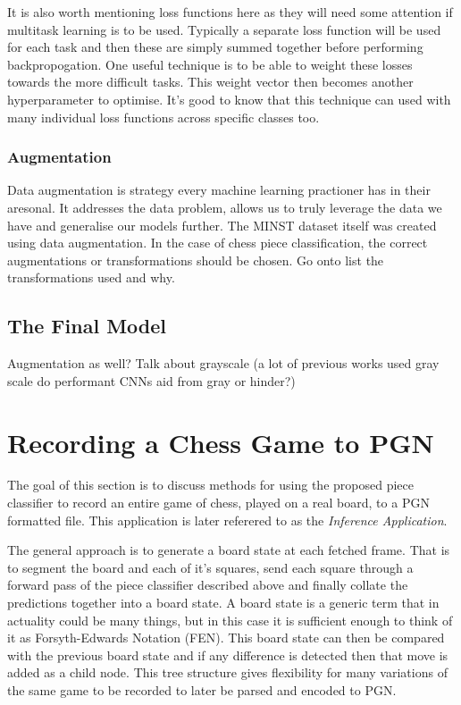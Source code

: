 It is also worth mentioning loss functions here as they will need some attention if multitask learning is to be used.  Typically a separate loss function will be 
used for each task and then these are simply summed together before performing backpropogation.  One useful technique is to be able to weight these losses towards 
the more difficult tasks.  This weight vector then becomes another hyperparameter to optimise.  It's good to know that this technique can used with many 
individual loss functions across specific classes too.

\subsubsection{Augmentation}
Data augmentation is strategy every machine learning practioner has in their aresonal.  It addresses the data problem, allows us to truly 
leverage the data we have and generalise our models further.  The MINST \cite{} dataset itself was created using data augmentation.
In the case of chess piece classification, the correct augmentations or transformations should be chosen.
Go onto list the transformations used and why.

\subsection{The Final Model}
\label{the model}
Augmentation as well?
Talk about grayscale (a lot of previous works used gray scale do performant CNNs aid from gray or hinder?)

\section{Recording a Chess Game to PGN}
The goal of this section is to discuss methods for using the proposed piece classifier to record an entire game of chess, played on a real board, 
to a PGN formatted file.  This application is later referered to as the \textit{Inference Application}.

The general approach is to generate a board state at each fetched frame.  That is to segment the board and each of it's squares, send each square 
through a forward pass of the piece classifier described above and finally collate the predictions together into a board state.  A board state is 
a generic term that in actuality could be many things, but in this case it is sufficient enough to think of it as Forsyth-Edwards Notation (FEN).
This board state can then be compared with the previous board state and if any difference is detected then that move is added as a child node.
This tree structure gives flexibility for many variations of the same game to be recorded to later be parsed and encoded to PGN.


